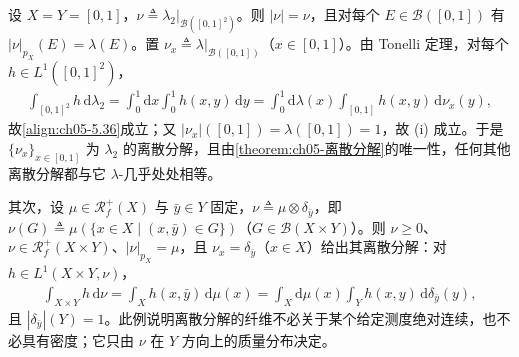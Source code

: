 \documentclass[../../main.tex]{subfiles}%
\begin{document}
\begin{example}[乘积测度的离散分解]\label{example:ch05-乘积测度分解}
设 $X=Y=[0,1]$，$\nu\triangleq\lambda_2|_{\mathscr{B}([0,1]^2)}$。则 $|\nu|=\nu$，且对每个 $E\in\mathscr{B}([0,1])$ 有 $|\nu|_{p_X}(E)=\lambda(E)$。置 $\nu_x\triangleq\lambda|_{\mathscr{B}([0,1])}$（$x\in[0,1]$）。由 Tonelli 定理，对每个 $h\in L^1([0,1]^2)$，
\begin{align*}
\int_{[0,1]^2}h\,\mathrm{d}\lambda_2
=\int_0^1\mathrm{d}x\int_0^1h(x,y)\,\mathrm{d}y
=\int_0^1\mathrm{d}\lambda(x)\int_{[0,1]}h(x,y)\,\mathrm{d}\nu_x(y),
\end{align*}
故\eqref{align:ch05-5.36}成立；又 $|\nu_x|([0,1])=\lambda([0,1])=1$，故 (i) 成立。于是 $\{\nu_x\}_{x\in[0,1]}$ 为 $\lambda_2$ 的离散分解，且由\cref{theorem:ch05-离散分解}的唯一性，任何其他离散分解都与它 $\lambda$-几乎处处相等。

其次，设 $\mu\in\mathscr{R}^+_f(X)$ 与 $\bar{y}\in Y$ 固定，$\nu\triangleq\mu\otimes\delta_{\bar{y}}$，即 $\nu(G)\triangleq\mu(\{x\in X\mid(x,\bar{y})\in G\})$（$G\in\mathscr{B}(X\times Y)$）。则 $\nu\geqslant0$、$\nu\in\mathscr{R}^+_f(X\times Y)$、$|\nu|_{p_X}=\mu$，且 $\nu_x=\delta_{\bar{y}}$（$x\in X$）给出其离散分解：对 $h\in L^1(X\times Y,\nu)$，
\begin{align*}
\int_{X\times Y}h\,\mathrm{d}\nu=\int_Xh(x,\bar{y})\,\mathrm{d}\mu(x)
=\int_X\mathrm{d}\mu(x)\int_Yh(x,y)\,\mathrm{d}\delta_{\bar{y}}(y),
\end{align*}
且 $|\delta_{\bar{y}}|(Y)=1$。此例说明离散分解的纤维不必关于某个给定测度绝对连续，也不必具有密度；它只由 $\nu$ 在 $Y$ 方向上的质量分布决定。
\end{example}
\end{document}
